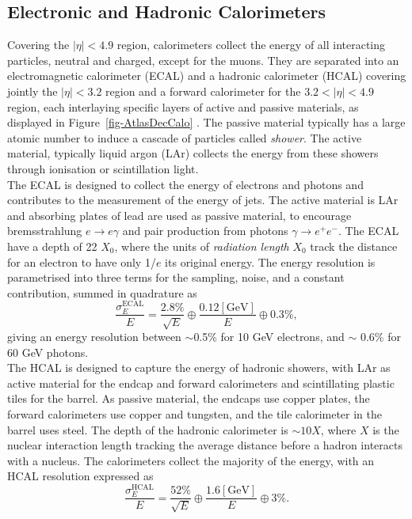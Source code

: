 \subsection{Electronic and Hadronic Calorimeters}
Covering the $|\eta| < 4.9$ region, calorimeters collect the energy of all interacting particles, neutral and charged, except for the muons. They are separated into an electromagnetic calorimeter (ECAL) and a hadronic calorimeter (HCAL) covering jointly the $|\eta| < 3.2$ region and a forward calorimeter for the $3.2 < |\eta| < 4.9$ region, each interlaying specific layers of active and passive materials, as displayed in Figure~\ref{fig-AtlasDecCalo} \cite{TheATLASCollaboration_2008}. The passive material typically has a large atomic number to induce a cascade of particles called \textit{shower}. The active material, typically liquid argon (LAr) collects the energy from these showers through ionisation or scintillation light.\\

The ECAL is designed to collect the energy of electrons and photons and contributes to the measurement of the energy of jets. The active material is LAr and absorbing plates of lead are used as passive material, to encourage bremsstrahlung $e \rightarrow e\gamma$ and pair production from photons $\gamma \rightarrow e^+e^-$. The ECAL have a depth of 22 $X_0$, where the units of \textit{radiation length} $X_0$ track the distance for an electron to have only 1/$e$ its original energy. The energy resolution is parametrised into three terms for the sampling, noise, and a constant contribution, summed in quadrature as \cite{Cavallari_2011}
\begin{equation}
  \frac{\sigma_E^{\text{ECAL}}}{E} = \frac{2.8\%}{\sqrt{E}} \oplus \frac{0.12 [\text{GeV}]}{E} \oplus 0.3\%,
\end{equation}
giving an energy resolution between $\sim$0.5\% for 10 GeV electrons, and $\sim$ 0.6\% for 60 GeV photons.\\

The HCAL is designed to capture the energy of hadronic showers, with LAr as active material for the endcap and forward calorimeters and scintillating plastic tiles for the barrel. As passive material, the endcaps use copper plates, the forward calorimeters use copper and tungsten, and the tile calorimeter in the barrel uses steel. The depth of the hadronic calorimeter is $\sim 10 X$, where $X$ is the nuclear interaction length tracking the average distance before a hadron interacts with a nucleus. The calorimeters collect the majority of the energy, with an HCAL resolution expressed as \cite{Cavallari_2011}
\begin{equation}
  \frac{\sigma_E^{\text{HCAL}}}{E} = \frac{52\%}{\sqrt{E}} \oplus \frac{1.6 [\text{GeV}]}{E} \oplus 3\%.
\end{equation}


